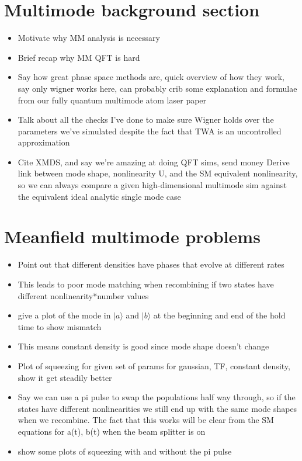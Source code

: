 \documentclass[12pt]{iopart}
\begin{document}
\section{Multimode background section}
\begin{itemize}
  \item Motivate why MM analysis is necessary
  \item Brief recap why MM QFT is hard
  \item Say how great phase space methods are, quick overview of how they work, say only wigner works here, can probably crib some explanation and formulae from our fully quantum multimode atom laser paper
  \item Talk about all the checks I've done to make sure Wigner holds over the parameters we've simulated despite the fact that TWA is an uncontrolled approximation
  \item Cite XMDS, and say we're amazing at doing QFT sims, send money
  Derive link between mode shape, nonlinearity U, and the SM equivalent nonlinearity, so we can always compare a given high-dimensional multimode sim against the equivalent ideal analytic single mode case
\end{itemize}

\section{Meanfield multimode problems}
\begin{itemize}
  \item Point out that different densities have phases that evolve at different rates
  \item This leads to poor mode matching when recombining if two states have different nonlinearity*number values 
  \item give a plot of the mode in $|a\rangle$ and $|b\rangle$ at the beginning and end of the hold time to show mismatch
  \item This means constant density is good since mode shape doesn't change
  \item Plot of squeezing for given set of params for gaussian, TF, constant density, show it get steadily better
  \item Say we can use a pi pulse to swap the populations half way through, so if the states have different nonlinearities we still end up with the same mode shapes when we recombine. The fact that this works will be clear from the SM equations for a(t), b(t) when the beam splitter is on
  \item show some plots of squeezing with and without the pi pulse
\end{itemize}
\end{document}
